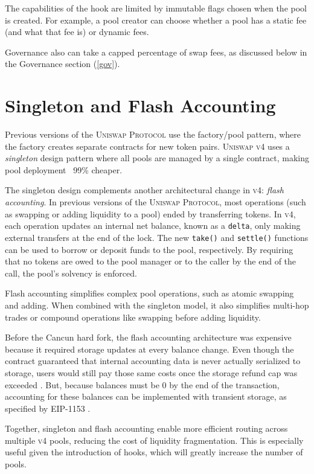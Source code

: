 \documentclass[sigconf,nonacm,prologue,table]{acmart}
\numberwithin{equation}{section}
\theoremstyle{definition}
\theoremstyle{remark}
\begin{document}
The capabilities of the hook are limited by immutable flags chosen when the pool is created. For example, a pool creator can choose whether a pool has a static fee (and what that fee is) or dynamic fees.

Governance also can take a capped percentage of swap fees, as discussed below in the Governance section (\ref{gov}). 

\section{Singleton and Flash Accounting} \label{flashaccounting}

Previous versions of the \textsc{Uniswap Protocol} use the factory/pool pattern, where the factory creates separate contracts for new token pairs. \textsc{Uniswap v4} uses a \emph{singleton} design pattern where all pools are managed by a single contract, making pool deployment ~99\% cheaper. 

The singleton design complements another architectural change in \textsc{v4}: \emph{flash accounting}. In previous versions of the \textsc{Uniswap Protocol}, most operations (such as swapping or adding liquidity to a pool) ended by transferring tokens. In \textsc{v4}, each operation updates an internal net balance, known as a \verb|delta|, only making external transfers at the end of the lock. The new \verb|take()| and  \verb|settle()| functions can be used to borrow or deposit funds to the pool, respectively. By requiring that no tokens are owed to the pool manager or to the caller by the end of the call, the pool's solvency is enforced. 

Flash accounting simplifies complex pool operations, such as atomic swapping and adding. When combined with the singleton model, it also simplifies multi-hop trades or compound operations like swapping before adding liquidity.

Before the Cancun hard fork, the flash accounting architecture was expensive because it required storage updates at every balance change. Even though the contract guaranteed that internal accounting data is never actually serialized to storage, users would still pay those same costs once the storage refund cap was exceeded \cite{Buterin2021}. But, because balances must be 0 by the end of the transaction, accounting for these balances can be implemented with transient storage, as specified by EIP-1153 \cite{Akhunov2018}.

Together, singleton and flash accounting enable more efficient routing across multiple \textsc{v4} pools, reducing the cost of liquidity fragmentation. This is especially useful given the introduction of hooks, which will greatly increase the number of pools. 
\end{document}
